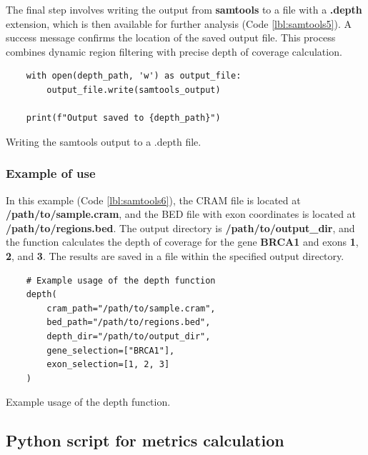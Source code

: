 The final step involves writing the output from \textbf{samtools} to a file with a \textbf{.depth} extension, which is then available for further analysis (Code \ref{lbl:samtools5}). A success message confirms the location of the saved output file. This process combines dynamic region filtering with precise depth of coverage calculation.

\begin{listing}[H]
\begin{verbatim}
    with open(depth_path, 'w') as output_file:
        output_file.write(samtools_output)

    print(f"Output saved to {depth_path}")
\end{verbatim}
\caption{Writing the samtools output to a .depth file.}
\label{lbl:samtools5}
\end{listing}


\subsubsection{\textbf{Example of use}}

In this example (Code \ref{lbl:samtools6}), the CRAM file is located at \textbf{/path/to/sample.cram}, and the BED file with exon coordinates is located at \textbf{/path/to/regions.bed}. The output directory is \textbf{/path/to/output\_dir}, and the function calculates the depth of coverage for the gene \textbf{BRCA1} and exons \textbf{1}, \textbf{2}, and \textbf{3}. The results are saved in a file within the specified output directory.

\begin{listing}[H]
\begin{verbatim}
    # Example usage of the depth function
    depth(
        cram_path="/path/to/sample.cram", 
        bed_path="/path/to/regions.bed", 
        depth_dir="/path/to/output_dir", 
        gene_selection=["BRCA1"], 
        exon_selection=[1, 2, 3]
    )
\end{verbatim}
\caption{Example usage of the depth function.}
\label{lbl:samtools6}
\end{listing}



\subsection{Python script for metrics calculation}

